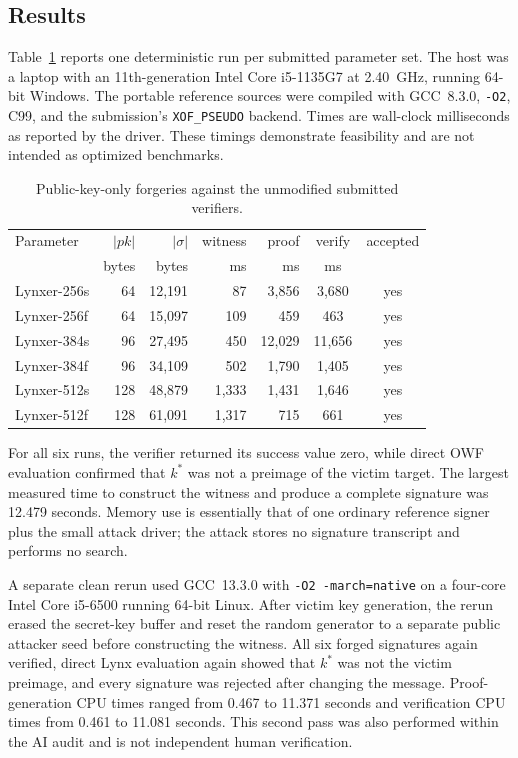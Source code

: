 \documentclass[11pt,a4paper]{article}
\begin{document}
\subsection{Results}

Table~\ref{tab:results} reports one deterministic run per submitted parameter set.  The host
was a laptop with an 11th-generation Intel Core i5-1135G7 at 2.40~GHz, running 64-bit
Windows.  The portable reference sources were compiled with GCC~8.3.0, \texttt{-O2}, C99,
and the submission's \texttt{XOF\_PSEUDO} backend.  Times are wall-clock milliseconds as
reported by the driver.  These timings demonstrate feasibility and are not intended as optimized benchmarks.

\begin{table}[h]
\centering
\caption{Public-key-only forgeries against the unmodified submitted verifiers.}
\label{tab:results}
\small
\begin{tabular}{lrrrrcc}
\toprule
Parameter & $|pk|$ & $|\sigma|$ & witness & proof & verify & accepted \\
          & bytes  & bytes      & ms      & ms    & ms     &          \\
\midrule
Lynxer-256s & 64  & 12,191 & 87  & 3,856  & 3,680  & yes \\
Lynxer-256f & 64  & 15,097 & 109 & 459    & 463    & yes \\
Lynxer-384s & 96  & 27,495 & 450 & 12,029 & 11,656 & yes \\
Lynxer-384f & 96  & 34,109 & 502 & 1,790  & 1,405  & yes \\
Lynxer-512s & 128 & 48,879 & 1,333 & 1,431 & 1,646 & yes \\
Lynxer-512f & 128 & 61,091 & 1,317 & 715   & 661    & yes \\
\bottomrule
\end{tabular}
\end{table}
\FloatBarrier

For all six runs, the verifier returned its success value zero, while direct OWF evaluation
confirmed that $k^*$ was not a preimage of the victim target.  The largest measured time to
construct the witness and produce a complete signature was 12.479 seconds.  Memory use is essentially that of one ordinary reference signer plus the small attack
driver; the attack stores no signature transcript and performs no search.

A separate clean rerun used GCC~13.3.0 with \texttt{-O2 -march=native} on a
four-core Intel Core i5-6500 running 64-bit Linux.  After victim key generation,
the rerun erased the secret-key buffer and reset the random generator to a
separate public attacker seed before constructing the witness.  All six forged
signatures again verified, direct Lynx evaluation again showed that $k^*$ was
not the victim preimage, and every signature was rejected after changing the
message.  Proof-generation CPU times ranged from 0.467 to 11.371 seconds and
verification CPU times from 0.461 to 11.081 seconds.  This second pass was also
performed within the AI audit and is not independent human verification.
\end{document}
